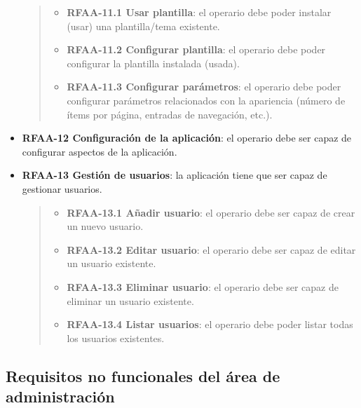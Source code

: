 \documentclass[
]{article}
\providecommand{\tightlist}{%
  \setlength{\itemsep}{0pt}\setlength{\parskip}{0pt}}
\begin{document}
\begin{itemize}
  \begin{quote}
  \begin{itemize}
  \tightlist
  \item
    \textbf{RFAA-11.1 Usar plantilla}: el operario debe poder instalar
    (usar) una plantilla/tema existente.
  \item
    \textbf{RFAA-11.2 Configurar plantilla}: el operario debe poder
    configurar la plantilla instalada (usada).
  \item
    \textbf{RFAA-11.3 Configurar parámetros}: el operario debe poder
    configurar parámetros relacionados con la apariencia (número de
    ítems por página, entradas de navegación, etc.).
  \end{itemize}
  \end{quote}
\item
  \textbf{RFAA-12 Configuración de la aplicación}: el operario debe ser
  capaz de configurar aspectos de la aplicación.
\item
  \textbf{RFAA-13 Gestión de usuarios}: la aplicación tiene que ser
  capaz de gestionar usuarios.

  \begin{quote}
  \begin{itemize}
  \tightlist
  \item
    \textbf{RFAA-13.1 Añadir usuario}: el operario debe ser capaz de
    crear un nuevo usuario.
  \item
    \textbf{RFAA-13.2 Editar usuario}: el operario debe ser capaz de
    editar un usuario existente.
  \item
    \textbf{RFAA-13.3 Eliminar usuario}: el operario debe ser capaz de
    eliminar un usuario existente.
  \item
    \textbf{RFAA-13.4 Listar usuarios}: el operario debe poder listar
    todas los usuarios existentes.
  \end{itemize}
  \end{quote}
\end{itemize}

\hypertarget{requisitos-no-funcionales-del-uxe1rea-de-administraciuxf3n}{%
\subsection{Requisitos no funcionales del área de
administración}\label{requisitos-no-funcionales-del-uxe1rea-de-administraciuxf3n}}
\end{document}
